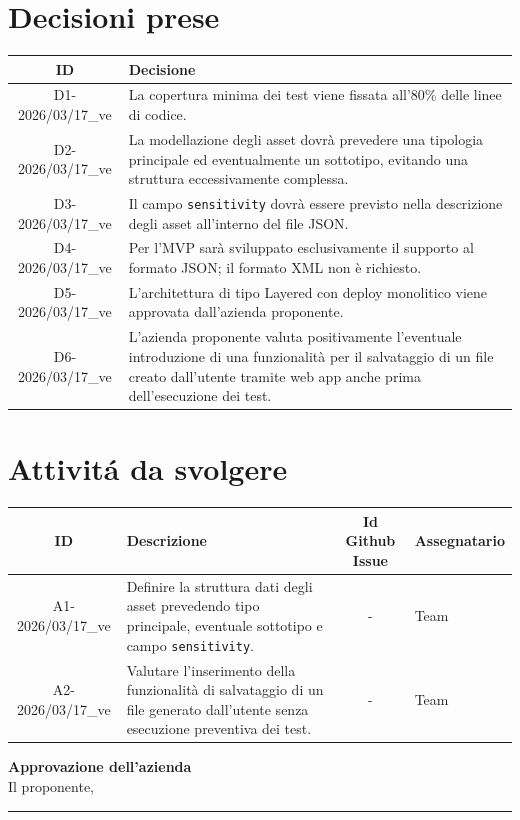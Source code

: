 \documentclass[a4paper,12pt]{article}
\newcommand{\DataVerbale}{2026/03/17}
\begin{document}
\section{Decisioni prese}{
    \begin{center}
    \begin{tabular}{|c|p{12cm}|}
        \hline
        \textbf{ID} & \textbf{Decisione} \\
        \hline
         D1-\DataVerbale\_ve & La copertura minima dei test viene fissata all'80\% delle linee di codice. \\
    \hline
    D2-\DataVerbale\_ve & La modellazione degli asset dovrà prevedere una tipologia principale ed eventualmente un sottotipo, evitando una struttura eccessivamente complessa. \\
    \hline
   D3-\DataVerbale\_ve & Il campo \texttt{sensitivity} dovrà essere previsto nella descrizione degli asset all'interno del file JSON. \\
    \hline
    D4-\DataVerbale\_ve & Per l'MVP sarà sviluppato esclusivamente il supporto al formato JSON; il formato XML non è richiesto. \\
    \hline
    D5-\DataVerbale\_ve & L'architettura di tipo Layered con deploy monolitico viene approvata dall'azienda proponente. \\
    \hline
    D6-\DataVerbale\_ve & L'azienda proponente valuta positivamente l'eventuale introduzione di una funzionalità per il salvataggio di un file creato dall'utente tramite web app anche prima dell'esecuzione dei test. \\
    \hline
    \end{tabular}
    \end{center}
}


\section{Attivitá da svolgere}{
    \begin{center}
    \begin{tabular}{|c|p{4.5cm}|c|p{3cm}|} 
        \hline
        \textbf{ID} & \textbf{Descrizione} & \textbf{Id Github Issue} & \textbf{Assegnatario}\\
        \hline
        A1-\DataVerbale\_ve & Definire la struttura dati degli asset prevedendo tipo principale, eventuale sottotipo e campo \texttt{sensitivity}. & - & Team \\
    \hline
    A2-\DataVerbale\_ve & Valutare l'inserimento della funzionalità di salvataggio di un file generato dall'utente senza esecuzione preventiva dei test. & - & Team \\
    \hline
    \end{tabular}
    \end{center}
}

\vspace{2cm}
\begin{flushright}
    \textbf{Approvazione dell'azienda} \\
    Il proponente,\\[0.5cm]
    \rule{6cm}{0.4pt}\\
\end{flushright}
\end{document}
